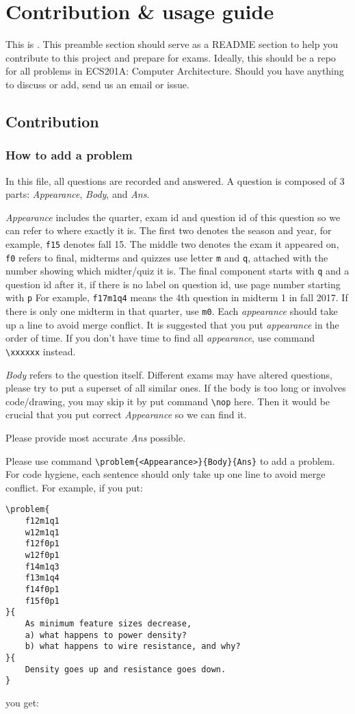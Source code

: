 \section*{Contribution \& usage guide}
This is \name. 
This preamble section should serve as a README section to help you contribute to this project and prepare for exams.
Ideally, this should be a repo for all problems in ECS201A: Computer Architecture.
Should you have anything to discuss or add, send us an email or issue.

\subsection*{Contribution}

\subsubsection*{How to add a problem}
In this file, all questions are recorded and answered.
A question is composed of 3 parts: \textit{Appearance}, \textit{Body}, and \textit{Ans}.

\textit{Appearance} includes the quarter, exam id and question id of this question so we can refer to where exactly it is.
The first two denotes the season and year, for example, \texttt{f15} denotes fall 15.
The middle two denotes the exam it appeared on, \texttt{f0} refers to final, midterms and quizzes use letter \texttt{m} and \texttt{q}, attached with the number showing which midter/quiz it is.
The final component starts with \texttt{q} and a question id after it, if there is no label on question id, use page number starting with \texttt{p}
For example, \texttt{f17m1q4} means the 4th question in midterm 1 in fall 2017. 
If there is only one midterm in that quarter, use \texttt{m0}.
Each \textit{appearance} should take up a line to avoid merge conflict. 
It is suggested that you put \textit{appearance} in the order of time.
If you don't have time to find all \textit{appearance}, use command \lstinline{\xxxxxx} instead.

\textit{Body} refers to the question itself. 
Different exams may have altered questions, please try to put a superset of all similar ones.
If the body is too long or involves code/drawing, you may skip it by put command \lstinline{\nop} here.
Then it would be crucial that you put correct \textit{Appearance} so we can find it.

Please provide most accurate \textit{Ans} possible.

Please use command \lstinline|\problem{<Appearance>}{Body}{Ans}| to add a problem.
For code hygiene, each sentence should only take up one line to avoid merge conflict.
For example, if you put:
\begin{lstlisting}
\problem{
    f12m1q1
    w12m1q1
    f12f0p1
    w12f0p1
    f14m1q3
    f13m1q4
    f14f0p1
    f15f0p1
}{
    As minimum feature sizes decrease, 
    a) what happens to power density?
    b) what happens to wire resistance, and why?
}{
    Density goes up and resistance goes down.
}
\end{lstlisting}
you get:

